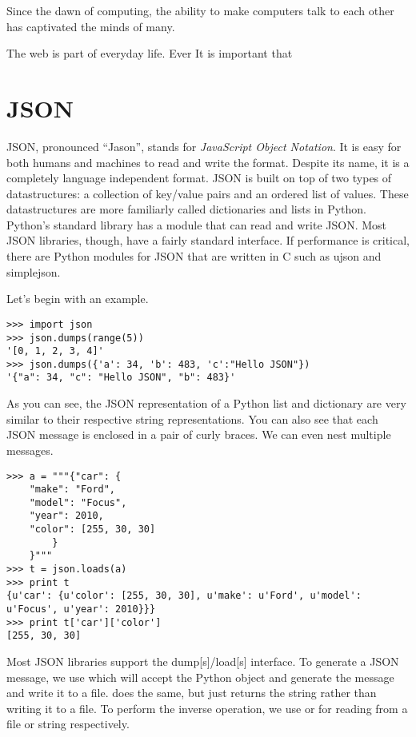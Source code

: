 \label{lab:webtech}

Since the dawn of computing, the ability to make computers talk to each other has captivated the minds of many.


The web is part of everyday life.
Ever
It is important that 

\section*{JSON}
JSON, pronounced ``Jason'', stands for \emph{JavaScript Object Notation}.
It is easy for both humans and machines to read and write the format.
Despite its name, it is a completely language independent format.
JSON is built on top of two types of datastructures: a collection of key/value pairs and an ordered list of values.
These datastructures are more familiarly called dictionaries and lists in Python.
Python's standard library has a module that can read and write JSON.
Most JSON libraries, though, have a fairly standard interface.
If performance is critical, there are Python modules for JSON that are written in C such as ujson and simplejson.

Let's begin with an example.
\begin{lstlisting}
>>> import json
>>> json.dumps(range(5))
'[0, 1, 2, 3, 4]'
>>> json.dumps({'a': 34, 'b': 483, 'c':"Hello JSON"})
'{"a": 34, "c": "Hello JSON", "b": 483}'
\end{lstlisting}
As you can see, the JSON representation of a Python list and dictionary are very similar to their respective string representations.
You can also see that each JSON message is enclosed in a pair of curly braces.
We can even nest multiple messages.
\begin{lstlisting}
>>> a = """{"car": {
    "make": "Ford",
    "model": "Focus",
    "year": 2010,
    "color": [255, 30, 30]
        }
    }"""
>>> t = json.loads(a)
>>> print t 
{u'car': {u'color': [255, 30, 30], u'make': u'Ford', u'model': u'Focus', u'year': 2010}}}
>>> print t['car']['color']
[255, 30, 30]
\end{lstlisting}

Most JSON libraries support the dump[s]/load[s] interface.
To generate a JSON message, we use  which will accept the Python object and generate the message and write it to a file.
 does the same, but just returns the string rather than writing it to a file.
To perform the inverse operation, we use  or  for reading from a file or string respectively.

